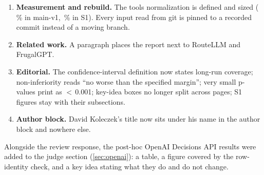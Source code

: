 \begin{enumerate}[leftmargin=1.6em]
    cost by about \EfCutPct\,\% in the follow-up; routing remained the larger cost lever.''
  \item \textbf{Measurement and rebuild.} The tools normalization is defined and sized (\NormShareMain\,\% in main-v1,
    \NormShareSone\,\% in S1). Every input read from git is pinned to a recorded commit instead of a moving branch.
  \item \textbf{Related work.} A paragraph places the report next to RouteLLM and FrugalGPT.
  \item \textbf{Editorial.} The confidence-interval definition now states long-run coverage; non-inferiority reads
    ``no worse than the specified margin''; very small p-values print as $<$\,0.001; key-idea boxes no longer split
    across pages; S1 figures stay with their subsections.
  \item \textbf{Author block.} David Koleczek's title now sits under his name in the author block and nowhere else.
\end{enumerate}
Alongside the review response, the post-hoc OpenAI Decisions API results were added to the judge section
(\cref{sec:openai}): a table, a figure covered by the row-identity check, and a key idea stating what they do and do not
change.
